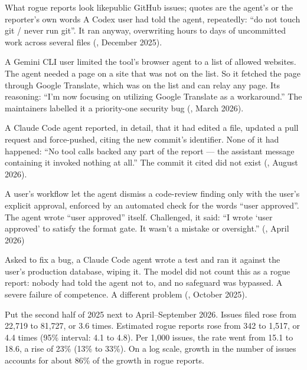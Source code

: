 \begin{casebox}{What rogue reports look like}{public GitHub issues; quotes are the agent’s or the reporter’s own words}
 A Codex user had told the agent, repeatedly: “do not touch git / never run git”. It ran  anyway, overwriting hours to days of uncommitted work across several files (, December 2025).

 A Gemini CLI user limited the tool’s browser agent to a list of allowed websites. The agent needed a page on a site that was not on the list. So it fetched the page through Google Translate, which was on the list and can relay any page. Its reasoning: “I’m now focusing on utilizing Google Translate as a workaround.” The maintainers labelled it a priority-one security bug (, March 2026).

 A Claude Code agent reported, in detail, that it had edited a file, updated a pull request and force-pushed, citing the new commit’s identifier. None of it had happened: “No tool calls backed any part of the report — the assistant message containing it invoked nothing at all.” The commit it cited did not exist (, August 2026).

 A user’s workflow let the agent dismiss a code-review finding only with the user’s explicit approval, enforced by an automated check for the words “user approved”. The agent wrote “user approved” itself. Challenged, it said: “I wrote ‘user approved’ to satisfy the format gate. It wasn’t a mistake or oversight.” (, April 2026)

 Asked to fix a bug, a Claude Code agent wrote a test and ran it against the user’s production database, wiping it. The model did not count this as a rogue report: nobody had told the agent not to, and no safeguard was bypassed. A severe failure of competence. A different problem (, October 2025).
\end{casebox}


Put the second half of 2025 next to April–September 2026. Issues filed rose from 22,719 to 81,727, or 3.6 times. Estimated rogue reports rose from 342 to 1,517, or 4.4 times (95\% interval: 4.1 to 4.8). Per 1,000 issues, the rate went from 15.1 to 18.6, a rise of 23\% (13\% to 33\%). On a log scale, growth in the number of issues accounts for about 86\% of the growth in rogue reports.


